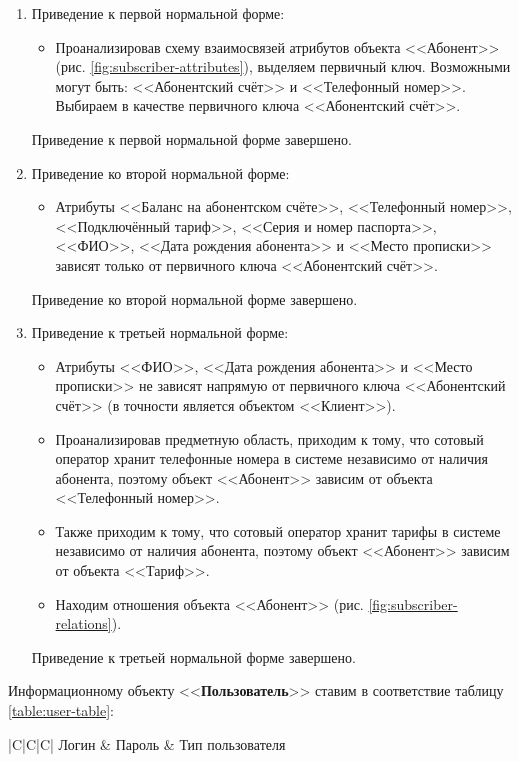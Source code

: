 \begin{enumerate}
    \item Приведение к первой нормальной форме:
    \begin{itemize}
        \item Проанализировав схему взаимосвязей атрибутов объекта <<Абонент>> (рис. \ref{fig:subscriber-attributes}), выделяем первичный ключ. Возможными могут быть: <<Абонентский счёт>> и <<Телефонный номер>>. Выбираем в качестве первичного ключа <<Абонентский счёт>>.
    \end{itemize}
    \tab\tab Приведение к первой нормальной форме завершено.

    \item Приведение ко второй нормальной форме:
    \begin{itemize}
        \item Атрибуты <<Баланс на абонентском счёте>>, <<Телефонный номер>>, <<Подключённый тариф>>, <<Серия и номер паспорта>>, <<ФИО>>, <<Дата рождения абонента>> и <<Место прописки>> зависят только от первичного ключа <<Абонентский счёт>>.
    \end{itemize}
    \tab\tab Приведение ко второй нормальной форме завершено.

    \item Приведение к третьей нормальной форме:
    \begin{itemize}
        \item Атрибуты <<ФИО>>, <<Дата рождения абонента>> и <<Место прописки>> не зависят напрямую от первичного ключа <<Абонентский счёт>> (в точности является объектом <<Клиент>>).
        \item Проанализировав предметную область, приходим к тому, что сотовый оператор хранит телефонные номера в системе независимо от наличия абонента, поэтому объект <<Абонент>> зависим от объекта <<Телефонный номер>>.
        \item Также приходим к тому, что сотовый оператор хранит тарифы в системе независимо от наличия абонента, поэтому объект <<Абонент>> зависим от объекта <<Тариф>>.
        \item Находим отношения объекта <<Абонент>> (рис. \ref{fig:subscriber-relations}).
    \end{itemize}
    \tab\tab Приведение к третьей нормальной форме завершено.
\end{enumerate}


Информационному объекту <<\textbf{Пользователь}>> ставим в соответствие таблицу \ref{table:user-table}:
\begin{table}[H]
    \caption{Таблица объекта <<Пользователь>>}
    \label{table:user-table}
    \renewcommand{\arraystretch}{1.5}
    \renewcommand{\tabularxcolumn}[1]{m{#1}}
    \begin{tabularx}{\textwidth}{|C|C|C|}
        \hline
        Логин & Пароль & Тип пользователя \\ \hline
    \end{tabularx}
\end{table}

